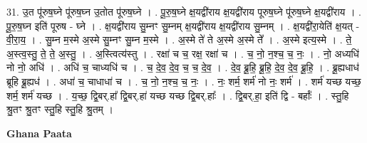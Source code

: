 \documentclass[17pt]{extarticle}
\begin{document}
31. उ॒त पू॑रुष॒घ्ने पू॑रुष॒घ्न उ॒तोत पू॑रुष॒घ्ने । . पू॒रु॒ष॒घ्ने क्ष॒यद्वी॑राय क्ष॒यद्वी॑राय पूरुष॒घ्ने पू॑रुष॒घ्ने क्ष॒यद्वी॑राय । . पू॒रु॒ष॒घ्न इति॑ पूरुष - घ्ने । . क्ष॒यद्वी॑राय सु॒म्नꣳ सु॒म्नम् क्ष॒यद्वी॑राय क्ष॒यद्वी॑राय सु॒म्नम् । . क्ष॒यद्वी॑रा॒येति॑ क्ष॒यत् - वी॒रा॒य॒ । . सु॒म्न म॒स्मे अ॒स्मे सु॒म्नꣳ सु॒म्न म॒स्मे । . अ॒स्मे ते॑ ते अ॒स्मे अ॒स्मे ते᳚ । . अ॒स्मे इत्य॒स्मे । . ते॒ अ॒स्त्व॒स्तु॒ ते॒ ते॒ अ॒स्तु॒ । . अ॒स्त्वित्य॑स्तु । . रक्षा॑ च च॒ रक्ष॒ रक्षा॑ च । . च॒ नो॒ न॒श्च॒ च॒ नः॒ । . नो॒ अध्यधि॑ नो नो॒ अधि॑ । . अधि॑ च॒ चाध्यधि॑ च । . च॒ दे॒व॒ दे॒व॒ च॒ च॒ दे॒व॒ । . दे॒व॒ ब्रू॒हि॒ ब्रू॒हि॒ दे॒व॒ दे॒व॒ ब्रू॒हि॒ । . ब्रू॒ह्यधाध॑ ब्रूहि ब्रू॒ह्यध॑ । . अधा॑ च॒ चाधाधा॑ च । . च॒ नो॒ न॒श्च॒ च॒ नः॒ । . नः॒ शर्म॒ शर्म॑ नो नः॒ शर्म॑ । . शर्म॑ यच्छ यच्छ॒ शर्म॒ शर्म॑ यच्छ । . य॒च्छ॒ द्वि॒बर्.हा᳚ द्वि॒बर्.हा॑ यच्छ यच्छ द्वि॒बर्.हाः᳚ । . द्वि॒बर्.हा॒ इति॑ द्वि - बर्हाः᳚ । . स्तु॒हि श्रु॒तꣳ श्रु॒तꣳ स्तु॒हि स्तु॒हि श्रु॒तम् । \newline

\textbf{Ghana Paata } \newline
\end{document}
